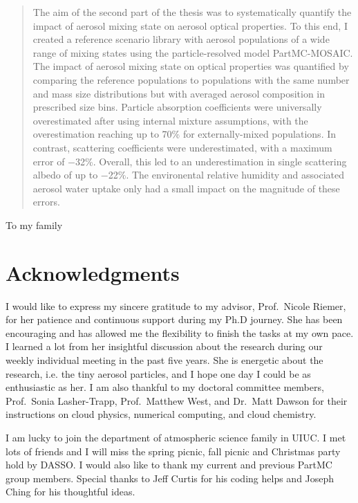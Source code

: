\documentclass[edeposit,fullpage]{uiucthesis2009}
\begin{document}
\begin{abstract}
The aim of the second part of the thesis was to systematically
quantify the impact of aerosol mixing state on aerosol optical
properties. To this end, I created a reference scenario library with
aerosol populations of a wide range of mixing states using the
particle-resolved model PartMC-MOSAIC. The impact of aerosol mixing
state on optical properties was quantified by comparing the reference
populations to populations with the same number and mass size
distributions but with averaged aerosol composition in prescribed size
bins. Particle absorption coefficients were universally overestimated
after using internal mixture assumptions, with the overestimation
reaching up to 70\% for externally-mixed populations. In contrast,
scattering coefficients were underestimated, with a maximum error of
$-$32\%. Overall, this led to an underestimation in single scattering
albedo of up to $-$22\%. The environental relative humidity and
associated aerosol water uptake only had a small impact on the
magnitude of these errors.

\end{abstract}

\begin{dedication}
To my family
\end{dedication}

\chapter*{Acknowledgments}
I would like to express my sincere gratitude to my advisor, Prof.\ Nicole Riemer, 
for her patience and continuous support during my Ph.D journey. She has been encouraging and has allowed me the flexibility to finish the tasks at my  own pace. I learned a lot from her insightful discussion about the research during our weekly individual meeting in the past five years. She is energetic about the research, i.e. the tiny aerosol particles, and I hope one day I could be as enthusiastic as her. I am also thankful to my doctoral committee members, Prof.\ Sonia Lasher-Trapp, Prof.\ Matthew West, and Dr.\ Matt Dawson for their instructions on cloud physics, numerical computing, and cloud chemistry.  

I am lucky to join the department of atmospheric science family in UIUC. I met lots of friends and I will miss the spring picnic, fall picnic and Christmas party hold by DASSO. I would also like to thank my current and previous PartMC group members. Special thanks to Jeff Curtis for his coding helps and Joseph Ching for his thoughtful ideas. 
\end{document}
